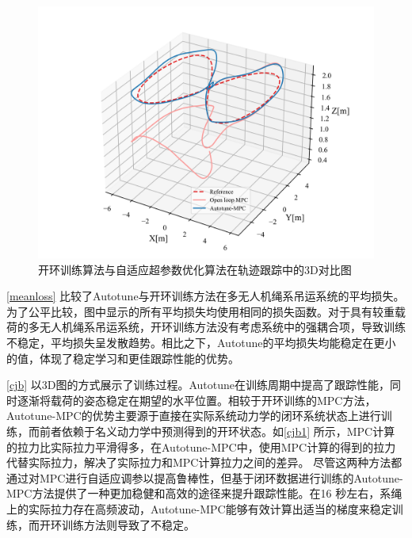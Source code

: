\documentclass[lang=chs, degree=master, blindreview=false, winfonts=true]{yanputhesis}
\begin{document}
\begin{figure}[hbt!]
	\centering
	\includegraphics[width=36pc]{picture/kk/plot3D.png} 
	\caption{开环训练算法与自适应超参数优化算法在轨迹跟踪中的3D对比图} 
	\label{cjb}
\end{figure}

\autoref{meanloss} 比较了Autotune与开环训练方法在多无人机绳系吊运系统的平均损失。为了公平比较，图中显示的所有平均损失均使用相同的损失函数。对于具有较重载荷的多无人机绳系吊运系统，开环训练方法没有考虑系统中的强耦合项，导致训练不稳定，平均损失呈发散趋势。相比之下，Autotune的平均损失均能稳定在更小的值，体现了稳定学习和更佳跟踪性能的优势。

\autoref{cjb} 以3D图的方式展示了训练过程。Autotune在训练周期中提高了跟踪性能，同时逐渐将载荷的姿态稳定在期望的水平位置。相较于开环训练的MPC方法，Autotune-MPC的优势主要源于直接在实际系统动力学的闭环系统状态上进行训练，而前者依赖于名义动力学中预测得到的开环状态。如\autoref{cjb1} 所示，MPC计算的拉力比实际拉力平滑得多，在Autotune-MPC中，使用MPC计算的得到的拉力代替实际拉力，解决了实际拉力和MPC计算拉力之间的差异。
尽管这两种方法都通过对MPC进行自适应调参以提高鲁棒性，但基于闭环数据进行训练的Autotune-MPC方法提供了一种更加稳健和高效的途径来提升跟踪性能。在16
秒左右，系绳上的实际拉力存在高频波动，Autotune-MPC能够有效计算出适当的梯度来稳定训练，而开环训练方法则导致了不稳定。
\end{document}
